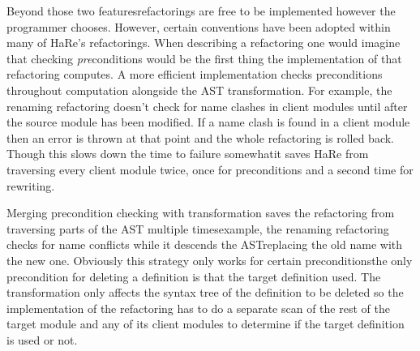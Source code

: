 Beyond those two features\DIFaddbegin \DIFadd{, }\DIFaddend refactorings are free to be implemented however the programmer chooses. However, certain conventions have been adopted within many of HaRe's refactorings. When describing a refactoring one would imagine that checking \textit{pre}conditions would be the first thing the implementation of that refactoring computes. A more efficient implementation checks preconditions throughout computation alongside the AST transformation. For example, the renaming refactoring doesn't check for name clashes in client modules until after the source module has been modified. If a name clash is found in a client module then an error is thrown at that point and the whole refactoring is rolled back. Though this slows down the time to failure somewhat\DIFaddbegin \DIFadd{, }\DIFaddend it saves HaRe from traversing every client module twice, once for preconditions and a second time for rewriting.

Merging precondition checking with transformation saves the refactoring from traversing parts of the AST multiple times\DIFdelbegin {}\DIFdelend \DIFaddbegin {}\DIFaddend example, the renaming refactoring checks for name conflicts while it descends the AST\DIFaddbegin \DIFadd{, }\DIFaddend replacing the old name with the new one. Obviously this strategy only works for certain preconditions\DIFaddbegin \DIFadd{: }\DIFaddend the only precondition for deleting a definition is that the target definition \DIFdelbegin {}\DIFdelend \DIFaddbegin {}\DIFaddend used. The transformation only affects the syntax tree of the definition to be deleted so the implementation of the refactoring has to do a separate scan of the rest of the target module and any of its client modules to determine if the target definition is used or not.

\subsection{\DIFdelbegin {}\DIFdelend \DIFaddbegin {}\DIFaddend }
\DIFaddbegin {}\texttt{}\DIFaddend 

